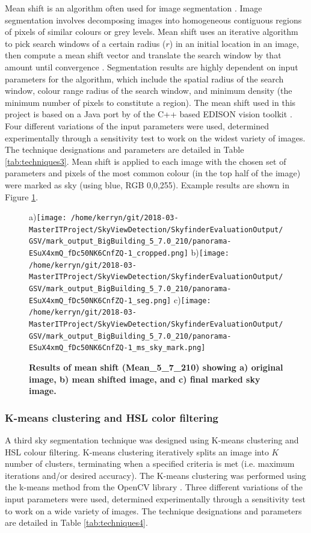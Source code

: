 \documentclass[final,3p,times,authoryear]{elsarticle}
\begin{document}
Mean shift is an algorithm often used for image segmentation \citep{Comaniciu1997,Comaniciu2002}. Image segmentation involves decomposing images into homogeneous contiguous regions of pixels of similar colours or grey levels. Mean shift uses an iterative algorithm to pick search windows of a certain radius ($r$) in an initial location in an image, then compute a mean shift vector and translate the search window by that amount until convergence \citep{Comaniciu1997}. Segmentation results are highly dependent on input parameters for the algorithm, which include the spatial radius of the search window, colour range radius of the search window, and minimum density (the minimum number of pixels to constitute a region). The mean shift used in this project is based on a Java port by \cite{Pangburn2002} of the C++ based EDISON vision toolkit \citep{Christoudias2002}. Four different variations of the input parameters were used, determined experimentally through a sensitivity test to work on the widest variety of images. The technique designations and parameters are detailed in Table \ref{tab:techniques3}. Mean shift is applied to each image with the chosen set of parameters and pixels of the most common colour (in the top half of the image) were marked as sky (using blue, RGB 0,0,255). Example results are shown in Figure \ref{fig:meanresults}.


\begin{figure}
\centering    
a)\texttt{[image: /home/kerryn/git/2018-03-MasterITProject/SkyViewDetection/SkyfinderEvaluationOutput/GSV/mark\_output\_BigBuilding\_5\_7.0\_210/panorama-ESuX4xmQ\_fDc50NK6CnfZQ-1\_cropped.png]} 
b)\texttt{[image: /home/kerryn/git/2018-03-MasterITProject/SkyViewDetection/SkyfinderEvaluationOutput/GSV/mark\_output\_BigBuilding\_5\_7.0\_210/panorama-ESuX4xmQ\_fDc50NK6CnfZQ-1\_seg.png]} 
c)\texttt{[image: /home/kerryn/git/2018-03-MasterITProject/SkyViewDetection/SkyfinderEvaluationOutput/GSV/mark\_output\_BigBuilding\_5\_7.0\_210/panorama-ESuX4xmQ\_fDc50NK6CnfZQ-1\_ms\_sky\_mark.png]} 
\caption{\bf  Results of mean shift (Mean\_5\_7\_210) showing a) original image, b) mean shifted image, and c) final marked sky image.}    
 \label{fig:meanresults}  
\end{figure} 



\subsubsection{K-means clustering and HSL color filtering}\label{sec:kmeans}
A third sky segmentation technique was designed using K-means clustering and HSL colour filtering. K-means clustering iteratively splits an image into $K$ number of clusters, terminating when a specified criteria is met (i.e. maximum iterations and/or desired accuracy). The K-means clustering was performed using the k-means method from the OpenCV library \citep{Bradski2000}. Three different variations of the input parameters were used, determined experimentally through a sensitivity test to work on a wide variety of images. The technique designations and parameters are detailed in Table \ref{tab:techniques4}. 
\end{document}

